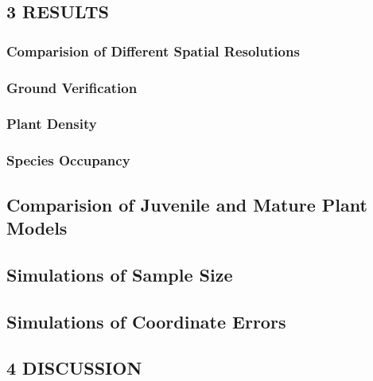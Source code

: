 \documentclass[
]{article}
\begin{document}
\hypertarget{results}{%
\subsection{3 \textbar{} RESULTS}\label{results}}

\hypertarget{comparision-of-different-spatial-resolutions-1}{%
\subsubsection{Comparision of Different Spatial
Resolutions}\label{comparision-of-different-spatial-resolutions-1}}

\hypertarget{ground-verification-1}{%
\subsubsection{Ground Verification}\label{ground-verification-1}}

\hypertarget{plant-density-1}{%
\subsubsection{Plant Density}\label{plant-density-1}}

\hypertarget{species-occupancy-1}{%
\subsubsection{Species Occupancy}\label{species-occupancy-1}}

\hypertarget{comparision-of-juvenile-and-mature-plant-models-1}{%
\subsection{Comparision of Juvenile and Mature Plant
Models}\label{comparision-of-juvenile-and-mature-plant-models-1}}

\hypertarget{simulations-of-sample-size-1}{%
\subsection{Simulations of Sample
Size}\label{simulations-of-sample-size-1}}

\hypertarget{simulations-of-coordinate-errors-1}{%
\subsection{Simulations of Coordinate
Errors}\label{simulations-of-coordinate-errors-1}}

\hypertarget{discussion}{%
\subsection{4 \textbar{} DISCUSSION}\label{discussion}}
\end{document}
